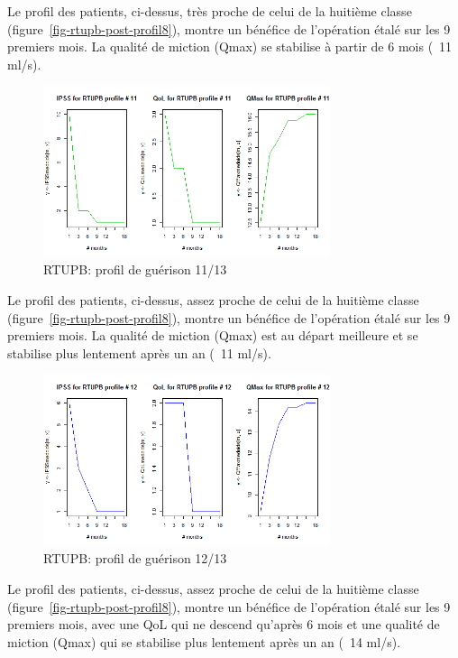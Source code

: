 Le profil des patients, ci-dessus, très proche de celui de la huitième classe (figure~\ref{fig-rtupb-post-profil8}), montre un bénéfice de l'opération étalé sur les 9 premiers mois. La qualité de miction (Qmax) se stabilise à partir de 6 mois (~11 ml/s).

\begin{figure}[H]
\centering
\includegraphics[width=0.75\textwidth]{../Fig/RTUPB/rtupb-profil-post-11.png}
\caption{RTUPB: profil de guérison 11/13}
\label{fig-rtupb-post-profil11}
\end{figure}

Le profil des patients, ci-dessus, assez proche de celui de la huitième classe (figure~\ref{fig-rtupb-post-profil8}), montre un bénéfice de l'opération étalé sur les 9 premiers mois. La qualité de miction (Qmax) est au départ meilleure et se stabilise plus lentement après un an (~11 ml/s).

\begin{figure}[H]
\centering
\includegraphics[width=0.75\textwidth]{../Fig/RTUPB/rtupb-profil-post-12.png}
\caption{RTUPB: profil de guérison 12/13}
\label{fig-rtupb-post-profil12}
\end{figure}

Le profil des patients, ci-dessus, assez proche de celui de la huitième classe (figure~\ref{fig-rtupb-post-profil8}), montre un bénéfice de l'opération étalé sur les 9 premiers mois, avec une QoL qui ne descend qu'après 6 mois et une qualité de miction (Qmax) qui se stabilise plus lentement après un an (~14 ml/s).

